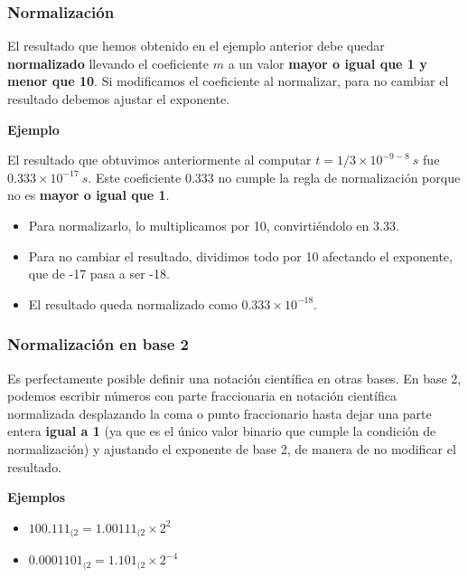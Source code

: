 \documentclass[spanish,A4,]{article}
\begin{document}
\subsubsection{Normalización}\label{normalizaciuxf3n}

El resultado que hemos obtenido en el ejemplo anterior debe quedar
\textbf{normalizado} llevando el coeficiente $m$ a un valor
\textbf{mayor o igual que 1 y menor que 10}. Si modificamos el
coeficiente al normalizar, para no cambiar el resultado debemos ajustar
el exponente.

\textbf{Ejemplo}

El resultado que obtuvimos anteriormente al computar
$t = 1 / 3 \times 10^{-9-8}\ s $ fue $0.333 \times 10^{-17}\ s$. Este
coeficiente $0.333$ no cumple la regla de normalización porque no es
\textbf{mayor o igual que 1}.

\begin{itemize}
\itemsep1pt\parskip0pt
\item
  Para normalizarlo, lo multiplicamos por 10, convirtiéndolo en $3.33$.
\item
  Para no cambiar el resultado, dividimos todo por 10 afectando el
  exponente, que de -17 pasa a ser -18.
\item
  El resultado queda normalizado como $0.333\times 10^{-18}$.
\end{itemize}

\subsubsection{Normalización en base
2}\label{normalizaciuxf3n-en-base-2}

Es perfectamente posible definir una notación científica en otras bases.
En base 2, podemos escribir números con parte fraccionaria en notación
científica normalizada desplazando la coma o punto fraccionario hasta
dejar una parte entera \textbf{igual a 1} (ya que es el único valor
binario que cumple la condición de normalización) y ajustando el
exponente de base 2, de manera de no modificar el resultado.

\textbf{Ejemplos}

\begin{itemize}
\itemsep1pt\parskip0pt
\item
  $100.111_{(2} = 1.00111_{(2} \times 2^2$
\item
  $0.0001101_{(2} = 1.101_{(2} \times 2^{-4}$
\end{itemize}
\end{document}
